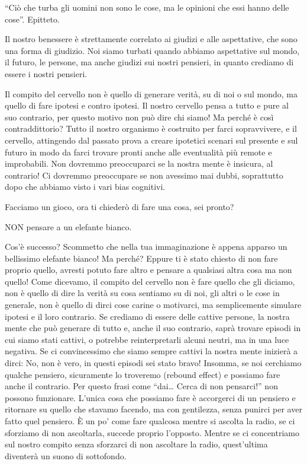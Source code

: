\documentclass[12pt]{book} %
\begin{document}
“Ciò che turba gli uomini non sono le cose, ma le opinioni che essi hanno delle cose”. Epitteto.

Il nostro benessere è strettamente correlato ai giudizi e alle aspettative, che sono una forma di giudizio. Noi siamo
turbati quando abbiamo aspettative sul mondo, il futuro, le persone, ma anche giudizi sui nostri pensieri, in quanto
crediamo di essere i nostri pensieri.

Il compito del cervello non è quello di generare verità, su di noi o sul mondo, ma quello di fare ipotesi e contro
ipotesi. Il nostro cervello pensa a tutto e pure al suo contrario, per questo motivo non può dire chi siamo! Ma perché
è così contraddittorio? Tutto il nostro organismo è costruito per farci sopravvivere, e il cervello, attingendo dal
passato prova a creare ipotetici scenari sul presente e sul futuro in modo da farci trovare pronti anche alle
eventualità più remote e improbabili. Non dovremmo preoccuparci se la nostra mente è insicura, al contrario! Ci
dovremmo preoccupare se non avessimo mai dubbi, soprattutto dopo che abbiamo visto i vari bias cognitivi. 

Facciamo un gioco, ora ti chiederò di fare una cosa, sei pronto?

NON pensare a un elefante bianco. 

Cos'è successo? Scommetto che nella tua immaginazione è appena apparso un bellissimo elefante
bianco! Ma perché? Eppure ti è stato chiesto di non fare proprio quello, avresti potuto fare altro e pensare a
qualsiasi altra cosa ma non quello! Come dicevamo, il compito del cervello non è fare quello che gli diciamo, non è
quello di dire la verità su cosa sentiamo su di noi, gli altri o le cose in generale, non è quello di dirci cose carine
o motivarci, ma semplicemente simulare ipotesi e il loro contrario. Se crediamo di essere delle cattive persone, la
nostra mente che può generare di tutto e, anche il suo contrario, saprà trovare episodi in cui siamo stati cattivi, o
potrebbe reinterpretarli alcuni neutri, ma in una luce negativa. Se ci convincessimo che siamo sempre cattivi la nostra
mente inizierà a dirci: No, non è vero, in questi episodi sei stato bravo! Insomma, se noi cerchiamo qualche pensiero,
sicuramente lo troveremo (rebound effect) e possiamo fare anche il contrario. Per questo frasi come “dai… Cerca di
non pensarci!” non possono funzionare. L'unica cosa che possiamo fare è accorgerci di un pensiero
e ritornare su quello che stavamo facendo, ma con gentilezza, senza punirci per aver fatto quel pensiero. È un
po' come fare qualcosa mentre si ascolta la radio, se ci sforziamo di non ascoltarla, succede
proprio l'opposto. Mentre se ci concentriamo sul nostro compito senza sforzarci di non ascoltare
la radio, quest'ultima diventerà un suono di sottofondo.
\end{document}
